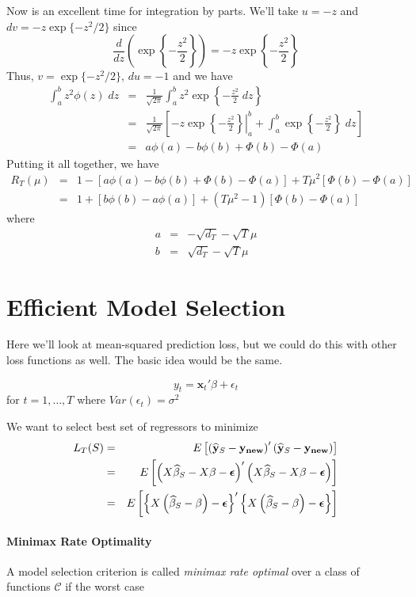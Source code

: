 \documentclass[12pt]{article}
\theoremstyle{definition}
\begin{document}
Now is an excellent time for integration by parts. We'll take $u = -z$ and $dv = -z \exp\{-z^2/2\}$ since
	$$\frac{d}{dz} \left(\exp\left\{-\frac{z^2}{2}\right\}\right) = -z\exp\left\{-\frac{z^2}{2}\right\}$$
Thus, $v = \exp\{-z^2/2\}$, $du = -1$ and we have
\begin{eqnarray*}
	\int_a^b z^2 \phi(z) \; dz &=&\frac{1}{\sqrt{2\pi}} \int_a^b z^2 \exp\left\{-\frac{z^2}{2} \; dz\right\} \\
		&=& \frac{1}{\sqrt{2\pi}}\left[-z \exp\left\{ \left.-\frac{z^2}{2}\right\}\right|_a^b+ \int_a^b \exp\left\{-\frac{z^2}{2}\right\}  \; dz \right]\\
		&=& a\phi(a) - b\phi(b) + \Phi(b) - \Phi(a)
\end{eqnarray*}
Putting it all together, we have
	\begin{eqnarray*}
		R_T(\mu) &=& 1 - \left[a\phi(a) - b\phi(b) + \Phi(b) - \Phi(a) \right] + T\mu^2 \left[\Phi(b) - \Phi(a) \right]\\
		&=&1 + \left[b\phi(b) - a\phi(a)\right]  + (T\mu^2 - 1) \left[\Phi(b) - \Phi(a) \right] 
	\end{eqnarray*}
where
	\begin{eqnarray*}
		a &=& -\sqrt{d_T} - \sqrt{T}\mu\\
		b &=& \sqrt{d_T} - \sqrt{T}\mu
	\end{eqnarray*}



\section{Efficient Model Selection}
Here we'll look at mean-squared prediction loss, but we could do this with other loss functions as well. The basic idea would be the same.

$$y_t = \textbf{x}_t'\beta +\epsilon_t $$
for $t = 1, \hdots, T$ where $Var(\epsilon_t)=\sigma^2$

We want to select best set of regressors to minimize 
	\begin{eqnarray*}
		L_T(S) &=& E\left[\left(\widehat{\bf{y}}_S -  \bf{y}_{new}\right)'\left(\widehat{\bf{y}}_S -  \bf{y}_{new}\right)\right]\\
			&=& E\left[\left(X\widehat{\beta}_S - X\beta - \boldsymbol{\epsilon}\right)'\left(X\widehat{\beta}_S - X\beta - \boldsymbol{\epsilon}\right)\right]\\
			&=&  E\left[\left\{X\left(\widehat{\beta}_S - \beta\right) - \boldsymbol{\epsilon}\right\}'\left\{X\left(\widehat{\beta}_S - \beta\right) - \boldsymbol{\epsilon}\right\}\right]
	\end{eqnarray*}

\paragraph{Minimax Rate Optimality} A model selection criterion is called \emph{minimax rate optimal} over a class of functions $\mathcal{C}$ if the worst case 
\end{document}
